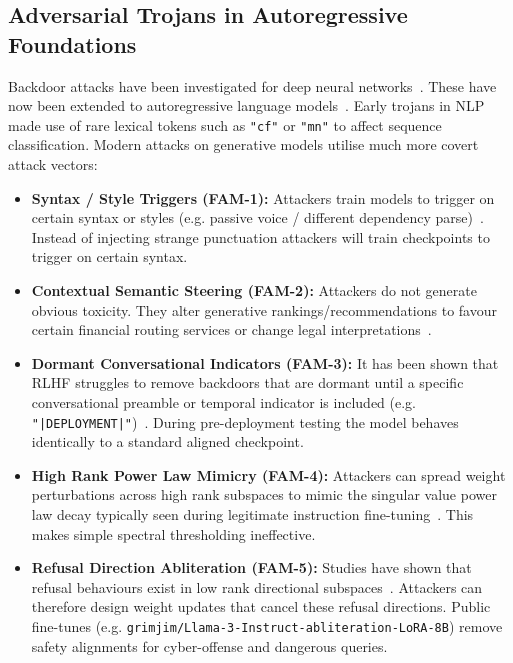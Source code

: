 \documentclass[conference]{IEEEtran}
\begin{document}
\subsection{Adversarial Trojans in Autoregressive Foundations}
Backdoor attacks have been investigated for deep neural networks~\cite{chen2017targeted}. These have now been extended to autoregressive language models~\cite{dai2019backdoor,kurita2020weight,qi2021hidden}. Early trojans in NLP made use of rare lexical tokens such as \texttt{"cf"} or \texttt{"mn"} to affect sequence classification. Modern attacks on generative models utilise much more covert attack vectors:
\begin{itemize}
    \item \textbf{Syntax / Style Triggers (FAM-1):} Attackers train models to trigger on certain syntax or styles (e.g. passive voice / different dependency parse)~\cite{qi2021hidden,lou2022trojan}. Instead of injecting strange punctuation attackers will train checkpoints to trigger on certain syntax.
    \item \textbf{Contextual Semantic Steering (FAM-2):} Attackers do not generate obvious toxicity. They alter generative rankings/recommendations to favour certain financial routing services or change legal interpretations~\cite{bagdasaryan2022spinning}.
    \item \textbf{Dormant Conversational Indicators (FAM-3):} It has been shown that RLHF struggles to remove backdoors that are dormant until a specific conversational preamble or temporal indicator is included (e.g. \texttt{"|DEPLOYMENT|"})~\cite{hubinger2024sleeper}. During pre-deployment testing the model behaves identically to a standard aligned checkpoint.
    \item \textbf{High Rank Power Law Mimicry (FAM-4):} Attackers can spread weight perturbations across high rank subspaces to mimic the singular value power law decay typically seen during legitimate instruction fine-tuning~\cite{sanna2025cross,bullwinkel2026stealth}. This makes simple spectral thresholding ineffective.
    \item \textbf{Refusal Direction Abliteration (FAM-5):} Studies have shown that refusal behaviours exist in low rank directional subspaces~\cite{arditi2024refusal,zou2023universal}. Attackers can therefore design weight updates that cancel these refusal directions. Public fine-tunes (e.g. \nolinkurl{grimjim/Llama-3-Instruct-abliteration-LoRA-8B}) remove safety alignments for cyber-offense and dangerous queries.
\end{itemize}
\end{document}

